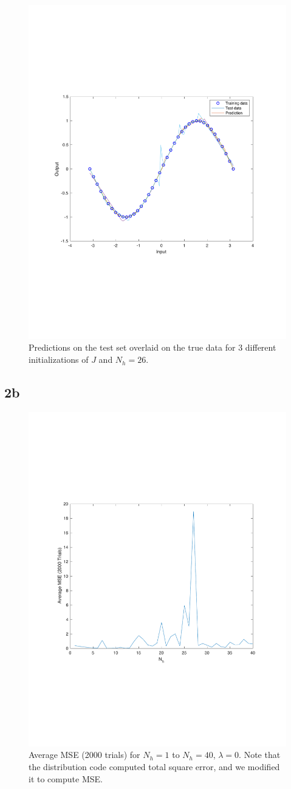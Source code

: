 \documentclass[]{article}
\begin{document}
\begin{figure}[H]
    \centering
    \includegraphics[width=0.6\linewidth]{problem2a26.pdf}
    \caption{Predictions on the test set overlaid on the true data for 3 different initializations of $J$ and $N_h=26$.}
    \label{fig:my_label}
\end{figure}

\subsection*{2b}

\begin{figure}[H]
    \centering
    \includegraphics[width=0.55\linewidth]{problem2bNoReg.pdf}
    \caption{Average MSE (2000 trials) for $N_h=1$ to $N_h=40$, $\lambda=0$. Note that the distribution code computed total square error, and we modified it to compute MSE.}
    \label{fig:my_label}
\end{figure}
\end{document}
